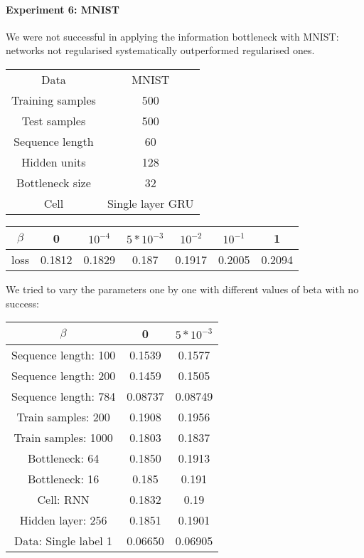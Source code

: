 \documentclass[a4paper]{article}
\begin{document}
\paragraph{Experiment 6: MNIST}

We were not successful in applying the information bottleneck with MNIST: networks not regularised systematically outperformed regularised ones.

\begin{center}
\begin{tabular}{ c | c  }
Data & MNIST \\
 Training samples & 500 \\ 
 Test samples &  500 \\
 Sequence length & 60 \\
 Hidden units & 128 \\
 Bottleneck size & 32 \\
 Cell & Single layer GRU
\end{tabular}
\end{center}


\begin{center}
\begin{tabular}{ c | c c c c c c}
 $\beta$ & 0 & $10^{-4}$ & $5*10^{-3}$ & $10^{-2}$ & $10^{-1}$ & 1 \\ 
 \hline
 loss & 0.1812 & 0.1829 & 0.187 & 0.1917 & 0.2005 & 0.2094 \\  
\end{tabular}
\end{center}

We tried to vary the parameters one by one with different values of beta with no success:
\begin{center}
\begin{tabular}{ c | c c }
$\beta$  & 0 & $5*10^{-3}$  \\
\hline
Sequence length: 100 & 0.1539 & 0.1577 \\
Sequence length: 200 & 0.1459 & 0.1505 \\
Sequence length: 784 & 0.08737 & 0.08749 \\
Train samples: 200 & 0.1908 & 0.1956 \\
Train samples: 1000 & 0.1803 & 0.1837 \\
Bottleneck: 64 & 0.1850 & 0.1913 \\
Bottleneck: 16 & 0.185 & 0.191 \\
Cell: RNN & 0.1832 & 0.19 \\
Hidden layer: 256 & 0.1851 & 0.1901 \\
Data: Single label 1 & 0.06650 & 0.06905 \\
\end{tabular}
\end{center}
\end{document}
